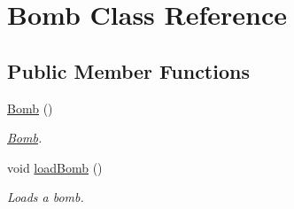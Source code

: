 \hypertarget{classBomb}{\section{Bomb Class Reference}
\label{classBomb}
}
\subsection*{Public Member Functions}
\begin{DoxyCompactItemize}
\item 
\hypertarget{classBomb_a5805401b6cfbb451cf31ebd4851740cf}{\hyperlink{classBomb_a5805401b6cfbb451cf31ebd4851740cf}{Bomb} ()}\label{classBomb_a5805401b6cfbb451cf31ebd4851740cf}

\begin{DoxyCompactList}\small\item\em \hyperlink{classBomb}{Bomb}. \end{DoxyCompactList}\item 
\hypertarget{classBomb_af32e12c49404d363ed6e2d611c78836e}{void \hyperlink{classBomb_af32e12c49404d363ed6e2d611c78836e}{load\-Bomb} ()}\label{classBomb_af32e12c49404d363ed6e2d611c78836e}

\begin{DoxyCompactList}\small\item\em Loads a bomb. \end{DoxyCompactList}\end{DoxyCompactItemize}
